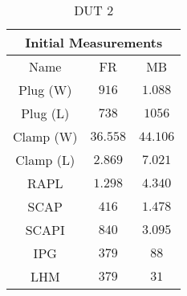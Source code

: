 \begin{table}[H]
    \centering
    \begin{tabular}{|| c | c | c ||}
    \hline
    \multicolumn{3}{||c||}{Initial Measurements} \\ [0.5ex] \hline\hline
    Name & FR & MB \\\hline
    Plug (W) & $916$ & $1.088$ \\
    Plug (L) & $738$ & $1056$ \\
    Clamp (W) & $36.558$ & $44.106$ \\
    Clamp (L) & $2.869$ & $7.021$ \\
    RAPL & $1.298$ & $4.340$ \\
    SCAP & $416$ & $1.478$ \\
    SCAPI & $840$ & $3.095$ \\
    IPG & $379$ & $88$ \\
    LHM & $379$ & $31$ \\\hline
    \end{tabular}
    \caption{DUT 2}
    \label{tab:initial-measurements-exp-2-dut-2}
\end{table}
